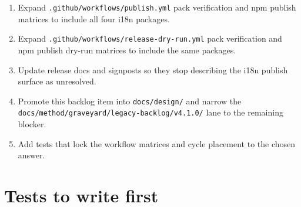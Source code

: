 \begin{enumerate}
\def\labelenumi{\arabic{enumi}.}
\tightlist
\item
  Expand \texttt{.\allowbreak{}g\allowbreak{}i\allowbreak{}t\allowbreak{}h\allowbreak{}u\allowbreak{}b\allowbreak{}/\allowbreak{}w\allowbreak{}o\allowbreak{}r\allowbreak{}k\allowbreak{}f\allowbreak{}l\allowbreak{}o\allowbreak{}w\allowbreak{}s\allowbreak{}/\allowbreak{}p\allowbreak{}u\allowbreak{}b\allowbreak{}l\allowbreak{}i\allowbreak{}s\allowbreak{}h\allowbreak{}.\allowbreak{}y\allowbreak{}m\allowbreak{}l} pack verification and npm publish matrices to include all four i18n packages.
\item
  Expand \texttt{.\allowbreak{}g\allowbreak{}i\allowbreak{}t\allowbreak{}h\allowbreak{}u\allowbreak{}b\allowbreak{}/\allowbreak{}w\allowbreak{}o\allowbreak{}r\allowbreak{}k\allowbreak{}f\allowbreak{}l\allowbreak{}o\allowbreak{}w\allowbreak{}s\allowbreak{}/\allowbreak{}r\allowbreak{}e\allowbreak{}l\allowbreak{}e\allowbreak{}a\allowbreak{}s\allowbreak{}e\allowbreak{}-\allowbreak{}d\allowbreak{}r\allowbreak{}y\allowbreak{}-\allowbreak{}r\allowbreak{}u\allowbreak{}n\allowbreak{}.\allowbreak{}y\allowbreak{}m\allowbreak{}l} pack verification and npm publish dry-run matrices to include the same packages.
\item
  Update release docs and signposts so they stop describing the i18n publish surface as unresolved.
\item
  Promote this backlog item into \texttt{d\allowbreak{}o\allowbreak{}c\allowbreak{}s\allowbreak{}/\allowbreak{}d\allowbreak{}e\allowbreak{}s\allowbreak{}i\allowbreak{}g\allowbreak{}n\allowbreak{}/} and narrow the \texttt{d\allowbreak{}o\allowbreak{}c\allowbreak{}s\allowbreak{}/\allowbreak{}m\allowbreak{}e\allowbreak{}t\allowbreak{}h\allowbreak{}o\allowbreak{}d\allowbreak{}/\allowbreak{}g\allowbreak{}r\allowbreak{}a\allowbreak{}v\allowbreak{}e\allowbreak{}y\allowbreak{}a\allowbreak{}r\allowbreak{}d\allowbreak{}/\allowbreak{}l\allowbreak{}e\allowbreak{}g\allowbreak{}a\allowbreak{}c\allowbreak{}y\allowbreak{}-\allowbreak{}b\allowbreak{}a\allowbreak{}c\allowbreak{}k\allowbreak{}l\allowbreak{}o\allowbreak{}g\allowbreak{}/\allowbreak{}v\allowbreak{}4\allowbreak{}.\allowbreak{}1\allowbreak{}.\allowbreak{}0\allowbreak{}/} lane to the remaining blocker.
\item
  Add tests that lock the workflow matrices and cycle placement to the chosen answer.
\end{enumerate}

\section{Tests to write first}\label{record-203-tests-to-write-first}

